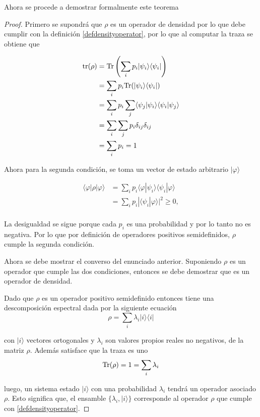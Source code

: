 Ahora se procede a demostrar formalmente este teorema


\begin{proof}
	Primero se supondrá que $\rho $ es un operador de densidad por lo que debe cumplir con la definición {\ref{defdensityoperator}}, por lo que al computar la traza se obtiene que
	
	
	
	\begin{equation*}
		\begin{split}
			{\rm tr(\rho)}&={\rm Tr}\left(\sum_{i} p_i|\psi_i\rangle \langle \psi_i|\right) \\
			&=	\sum_{i}p_i {\rm Tr}(|\psi_i\rangle \langle \psi_i|)\\
			&=\sum_{i}p_i \sum_j\langle \psi_j|\psi_i\rangle \langle \psi_i|\psi_j\rangle\\
			&=\sum_{i}\sum_j p_i \delta_{ij} \delta_{ij}\\
			&=\sum_i p_i=1\\
		\end{split}
	\end{equation*}

Ahora para la segunda condición, se toma un vector de estado arbitrario $|\varphi \rangle$

 
\begin{equation*}
	\begin{split}
	\langle \varphi |	\rho|\varphi \rangle&=\sum_{i}p_i\langle \varphi |\psi_i\rangle \langle \psi_i|\varphi \rangle \\
	&=\sum_{i}p_i| \langle \psi_i|\varphi \rangle|^2 \ge 0,\\
	\end{split}
\end{equation*}

La desigualdad se sigue porque cada $p_i$ es una probabilidad y por lo tanto no es negativa. Por lo que por definición de operadores positivos semidefinidos, $\rho$ cumple la segunda condición.


Ahora se debe mostrar el converso del enunciado anterior. Suponiendo $\rho$ es un operador que cumple las dos condiciones, entonces se debe demostrar que es un operador de densidad.

Dado que $\rho$ es un operador positivo semidefinido entonces tiene una descomposición espectral dada por la siguiente ecuación {\cite{nielsen_chuang_2010}}
\[\rho=\sum_i \lambda_i |i\rangle \langle i|\]

con $|i\rangle$ vectores ortogonales y $\lambda_i$ son valores propios reales no negativos, de la matriz $\rho$. Además satisface que la traza es uno 
\[{\rm Tr}(\rho)=1=\sum_i\lambda_i\]

luego, un sistema estado $|i\rangle$ con una probabilidad $\lambda_i$ tendrá un operador asociado $\rho$. Esto significa que, el ensamble $\{\lambda_i, |i\rangle\}$  corresponde al operador $\rho$ que cumple con {\ref{defdensityoperator}}.


\end{proof}



